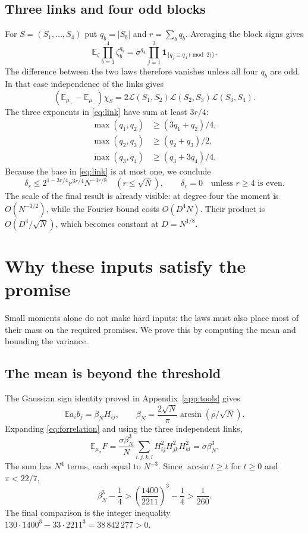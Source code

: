 \documentclass[11pt]{article}
\newcommand{\E}{\mathbb E}
\newcommand{\1}{\mathbf 1}
\begin{document}
\subsection{Three links and four odd blocks}
For $S=(S_1,\ldots,S_4)$ put $q_b=|S_b|$ and $r=\sum_bq_b$.
Averaging the block signs gives
\[
 \E_\zeta\prod_{b=1}^4\zeta_b^{q_b}
 =\sigma^{q_4}\prod_{j=1}^3\1_{\{q_j\equiv q_4\pmod2\}}.
\]
The difference between the two laws therefore vanishes unless all
four $q_b$ are odd. In that case independence of the links gives
\[
 (\E_{\mu_+}-\E_{\mu_-})\chi_S
       =2\mathcal L(S_1,S_2)\mathcal L(S_2,S_3)\mathcal L(S_3,S_4).
\]
The three exponents in \eqref{eq:link} have sum at least $3r/4$:
\[
 \begin{aligned}
 \max(q_1,q_2)&\ge(3q_1+q_2)/4,\\
 \max(q_2,q_3)&\ge(q_2+q_3)/2,\\
 \max(q_3,q_4)&\ge(q_3+3q_4)/4.
 \end{aligned}
\]
Because the base in \eqref{eq:link} is at most one, we conclude
\begin{equation}\label{eq:moments}
 \delta_r\le2^{1-3r/4}r^{3r/4}N^{-3r/8}\quad(r\le\sqrt N),
 \qquad \delta_r=0\quad\text{unless $r\ge4$ is even}.
\end{equation}
The scale of the final result is already visible: at degree four the
moment is $O(N^{-3/2})$, while the Fourier bound costs $O(D^4N)$.
Their product is $O(D^4/\sqrt N)$, which becomes constant at $D=N^{1/8}$.

\section{Why these inputs satisfy the promise}\label{sec:concentration}
Small moments alone do not make hard inputs: the laws must also place
most of their mass on the required promises. We prove this by computing
the mean and bounding the variance.

\subsection{The mean is beyond the threshold}
The Gaussian sign identity proved in Appendix~\ref{app:tools} gives
\[
 \E a_i b_j=\beta_N H_{ij},\qquad
 \beta_N=\frac{2\sqrt N}{\pi}\arcsin(\rho/\sqrt N).
\]
Expanding \eqref{eq:forrelation} and using the three independent links,
\[
 \E_{\mu_\sigma}F
 =\frac{\sigma\beta_N^3}{N}\sum_{i,j,k,l}H_{ij}^2H_{jk}^2H_{kl}^2
 =\sigma\beta_N^3.
\]
The sum has $N^4$ terms, each equal to $N^{-3}$.
Since $\arcsin t\ge t$ for $t\ge0$ and $\pi<22/7$,
\begin{equation}\label{eq:margin}
 \beta_N^3-\frac14>
       \left(\frac{1400}{2211}\right)^3-\frac14>\frac1{260}.
\end{equation}
The final comparison is the integer inequality
$130\cdot1400^3-33\cdot2211^3=38\,842\,277>0$.
\end{document}
